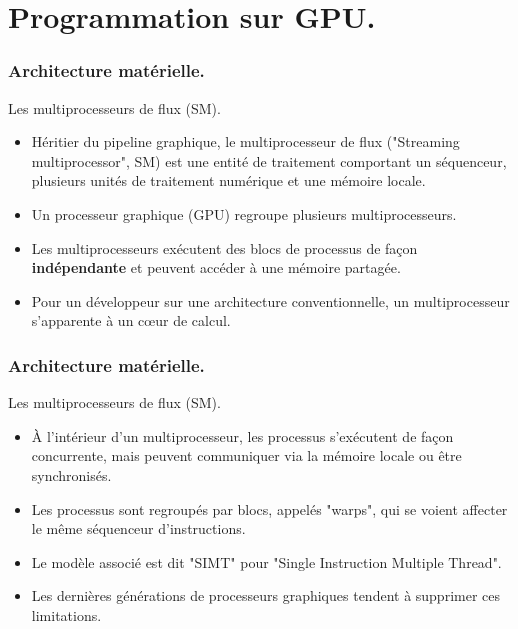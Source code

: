 \section{Programmation sur GPU.}
\begin{frame}
    \frametitle{Architecture matérielle.}
\begin{block}{Les multiprocesseurs de flux (SM).}
   \begin{itemize}
    \item<+-> Héritier du pipeline graphique, le multiprocesseur de flux ("Streaming multiprocessor", SM) 
    est une entité de traitement comportant un séquenceur, plusieurs unités de traitement numérique et une mémoire locale.
    \item<+-> Un processeur graphique (GPU) regroupe plusieurs multiprocesseurs. 
    \item<+-> Les multiprocesseurs exécutent des blocs de processus de façon \textbf{indépendante} et peuvent accéder à
    une mémoire partagée.
    \item<+-> Pour un développeur sur une architecture conventionnelle, un multiprocesseur s'apparente à un c{\oe}ur de calcul.
   \end{itemize} 
\end{block}
    

\end{frame}
\begin{frame}
    \frametitle{Architecture matérielle.}
\begin{block}{Les multiprocesseurs de flux (SM).}
   \begin{itemize}
    \item<+->À l'intérieur d'un multiprocesseur, les processus s'exécutent de façon concurrente, mais peuvent communiquer
    via la mémoire locale ou être synchronisés.
    \item<+->Les processus sont regroupés par blocs, appelés "warps", qui se voient affecter le même séquenceur 
    d'instructions.
    \item<+->Le modèle associé est dit "SIMT" pour "Single Instruction Multiple Thread".
    \item<+->Les dernières générations de processeurs graphiques tendent à supprimer ces limitations.
   \end{itemize} 
\end{block}
\end{frame}

